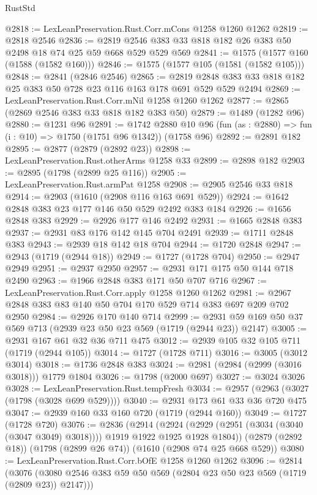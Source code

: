 \begin{lexlean}{RustStd}
\begin{coremodule}
@2818 := LexLeanPreservation.Rust.Corr.mCons @1258 @1260 @1262
@2819 := @2818 @2546
@2836 := @2819 @2546 @383 @33 @818 @182 @26 @383 @50 @2498 @18 @74 @25 @59 @668 @529 @529 @569
@2841 := @1575 (@1577 @160 (@1588 (@1582 @160)))
@2846 := @1575 (@1577 @105 (@1581 (@1582 @105)))
@2848 := @2841 (@2846 @2546)
@2865 := @2819 @2848 @383 @33 @818 @182 @25 @383 @50 @728 @23 @116 @163 @178 @691 @529 @529 @2494
@2869 := LexLeanPreservation.Rust.Corr.mNil @1258 @1260 @1262
@2877 := @2865 (@2869 @2546 @383 @33 @818 @182 @383 @50)
@2879 := @1489 (@1282 @96)
@2880 := @1231 @96
@2891 := @1742
    @2880
    @10
    @96
    (fun (as : @2880) => fun (i : @10) => @1750 (@1751 @96 @1342))
    (@1758 @96)
@2892 := @2891 @182
@2895 := @2877 (@2879 (@2892 @23))
@2898 := LexLeanPreservation.Rust.otherArms @1258 @33
@2899 := @2898 @182
@2903 := @2895 (@1798 (@2899 @25 @116))
@2905 := LexLeanPreservation.Rust.armPat @1258
@2908 := @2905 @2546 @33 @818
@2914 := @2903 (@1610 (@2908 @116 @163 @691 @529))
@2924 := @1642 @2848 @383 @23 @177 @146 @50 @529 @2492 @383 @184
@2926 := @1656 @2848 @383
@2929 := @2926 @177 @146 @2492
@2931 := @1665 @2848 @383
@2937 := @2931 @83 @176 @142 @145 @704 @2491
@2939 := @1711 @2848 @383
@2943 := @2939 @18 @142 @18 @704
@2944 := @1720 @2848
@2947 := @2943 (@1719 (@2944 @18))
@2949 := @1727 (@1728 @704)
@2950 := @2947 @2949
@2951 := @2937 @2950
@2957 := @2931 @171 @175 @50 @144 @718 @2490
@2963 := @1966 @2848 @383 @171 @50 @707 @716
@2967 := LexLeanPreservation.Rust.Corr.apply @1258 @1260 @1262
@2981 := @2967 @2848 @383 @83 @140 @50 @704 @170 @529 @714 @383 @697 @209 @702 @2950
@2984 := @2926 @170 @140 @714
@2999 := @2931 @59 @169 @50 @37 @569 @713 (@2939 @23 @50 @23 @569 (@1719 (@2944 @23)) @2147)
@3005 := @2931 @167 @61 @32 @36 @711 @475
@3012 := @2939 @105 @32 @105 @711 (@1719 (@2944 @105))
@3014 := @1727 (@1728 @711)
@3016 := @3005 (@3012 @3014)
@3018 := @1736 @2848 @383
@3024 := @2981 (@2984 (@2999 (@3016 @3018))) @1779 @1804
@3026 := @1798 (@2000 @697)
@3027 := @3024 @3026
@3028 := LexLeanPreservation.Rust.tempFresh
@3034 := @2957 (@2963 (@3027 (@1798 (@3028 @699 @529))))
@3040 := @2931 @173 @61 @33 @36 @720 @475
@3047 := @2939 @160 @33 @160 @720 (@1719 (@2944 @160))
@3049 := @1727 (@1728 @720)
@3076 := @2836
    (@2914
      (@2924 (@2929 (@2951 (@3034 (@3040 (@3047 @3049) @3018)))) @1919 @1922 @1925 @1928 @1804))
    (@2879 (@2892 @18))
    (@1798 (@2899 @26 @74))
    (@1610 (@2908 @74 @25 @668 @529))
@3080 := LexLeanPreservation.Rust.Corr.bOfE @1258 @1260 @1262
@3096 := @2814
    (@3076 (@3080 @2546 @383 @59 @50 @569 (@2804 @23 @50 @23 @569 (@1719 (@2809 @23)) @2147)))

\end{coremodule}
\end{lexlean}
